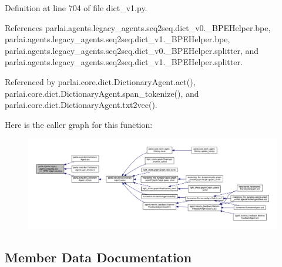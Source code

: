 Definition at line 704 of file dict\+\_\+v1.\+py.



References parlai.\+agents.\+legacy\+\_\+agents.\+seq2seq.\+dict\+\_\+v0.\+\_\+\+B\+P\+E\+Helper.\+bpe, parlai.\+agents.\+legacy\+\_\+agents.\+seq2seq.\+dict\+\_\+v1.\+\_\+\+B\+P\+E\+Helper.\+bpe, parlai.\+agents.\+legacy\+\_\+agents.\+seq2seq.\+dict\+\_\+v0.\+\_\+\+B\+P\+E\+Helper.\+splitter, and parlai.\+agents.\+legacy\+\_\+agents.\+seq2seq.\+dict\+\_\+v1.\+\_\+\+B\+P\+E\+Helper.\+splitter.



Referenced by parlai.\+core.\+dict.\+Dictionary\+Agent.\+act(), parlai.\+core.\+dict.\+Dictionary\+Agent.\+span\+\_\+tokenize(), and parlai.\+core.\+dict.\+Dictionary\+Agent.\+txt2vec().

Here is the caller graph for this function\+:
\nopagebreak
\begin{figure}[H]
\begin{center}
\leavevmode
\includegraphics[width=350pt]{classparlai_1_1agents_1_1legacy__agents_1_1seq2seq_1_1dict__v1_1_1__BPEHelper_a4123dd721a13dc6607498ae29d7dd8a3_icgraph}
\end{center}
\end{figure}


\subsection{Member Data Documentation}
\mbox{\label{classparlai_1_1agents_1_1legacy__agents_1_1seq2seq_1_1dict__v1_1_1__BPEHelper_ac6a1f3216616fc9ac78a4b5501693848}} 
